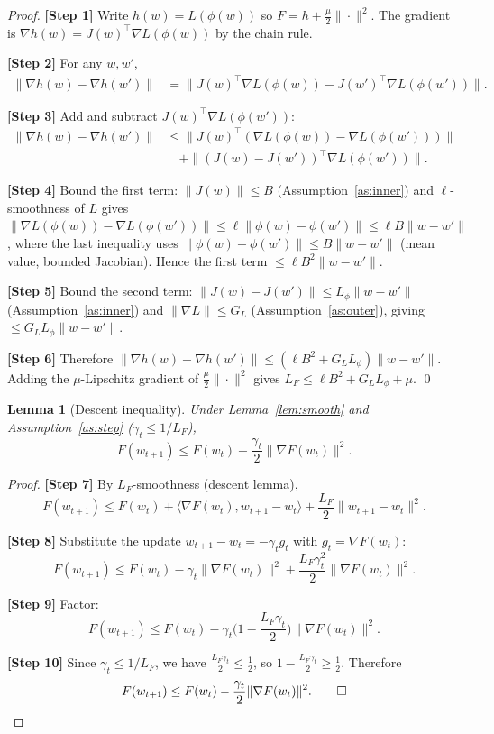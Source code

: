 \documentclass[11pt]{article}
\newtheorem{lemma}{Lemma}
\begin{document}
\begin{proof}
\textbf{[Step 1]} Write $h(w)=L(\phi(w))$ so $F = h + \tfrac{\mu}{2}\|\cdot\|^2$.
The gradient is $\nabla h(w) = J(w)^\top \nabla L(\phi(w))$ by the chain rule.

\textbf{[Step 2]} For any $w,w'$,
\begin{align*}
\|\nabla h(w) - \nabla h(w')\|
&= \big\| J(w)^\top \nabla L(\phi(w)) - J(w')^\top \nabla L(\phi(w')) \big\|.
\end{align*}

\textbf{[Step 3]} Add and subtract $J(w)^\top \nabla L(\phi(w'))$:
\begin{align*}
\|\nabla h(w) - \nabla h(w')\|
&\le \| J(w)^\top (\nabla L(\phi(w)) - \nabla L(\phi(w'))) \|\\
&\quad + \|(J(w)-J(w'))^\top \nabla L(\phi(w'))\|.
\end{align*}

\textbf{[Step 4]} Bound the first term: $\|J(w)\|\le B$ (Assumption~\ref{as:inner})
and $\ell$-smoothness of $L$ gives
$\|\nabla L(\phi(w))-\nabla L(\phi(w'))\| \le \ell\|\phi(w)-\phi(w')\|
\le \ell B\|w-w'\|$, where the last inequality uses
$\|\phi(w)-\phi(w')\|\le B\|w-w'\|$ (mean value, bounded Jacobian).
Hence the first term $\le \ell B^2 \|w-w'\|$.

\textbf{[Step 5]} Bound the second term: $\|J(w)-J(w')\|\le L_\phi\|w-w'\|$
(Assumption~\ref{as:inner}) and $\|\nabla L\|\le G_L$ (Assumption~\ref{as:outer}),
giving $\le G_L L_\phi \|w-w'\|$.

\textbf{[Step 6]} Therefore
$\|\nabla h(w)-\nabla h(w')\| \le (\ell B^2 + G_L L_\phi)\|w-w'\|$.
Adding the $\mu$-Lipschitz gradient of $\tfrac{\mu}{2}\|\cdot\|^2$ gives
$L_F \le \ell B^2 + G_L L_\phi + \mu$. \qed
\end{proof}

\begin{lemma}[Descent inequality]\label{lem:descent}
Under Lemma~\ref{lem:smooth} and Assumption~\ref{as:step}
($\gamma_t \le 1/L_F$),
\[
F(w_{t+1}) \le F(w_t) - \frac{\gamma_t}{2}\|\nabla F(w_t)\|^2 .
\]
\end{lemma}

\begin{proof}
\textbf{[Step 7]} By $L_F$-smoothness (descent lemma),
\[
F(w_{t+1}) \le F(w_t) + \langle \nabla F(w_t), w_{t+1}-w_t\rangle
+ \frac{L_F}{2}\|w_{t+1}-w_t\|^2 .
\]

\textbf{[Step 8]} Substitute the update $w_{t+1}-w_t = -\gamma_t g_t$ with
$g_t = \nabla F(w_t)$:
\[
F(w_{t+1}) \le F(w_t) - \gamma_t \|\nabla F(w_t)\|^2
+ \frac{L_F \gamma_t^2}{2}\|\nabla F(w_t)\|^2 .
\]

\textbf{[Step 9]} Factor:
\[
F(w_{t+1}) \le F(w_t) - \gamma_t\Big(1 - \frac{L_F \gamma_t}{2}\Big)
\|\nabla F(w_t)\|^2 .
\]

\textbf{[Step 10]} Since $\gamma_t \le 1/L_F$, we have
$\tfrac{L_F\gamma_t}{2}\le \tfrac12$, so
$1-\tfrac{L_F\gamma_t}{2}\ge \tfrac12$. Therefore
\[
F(w_{t+1}) \le F(w_t) - \frac{\gamma_t}{2}\|\nabla F(w_t)\|^2 . \qed
\]
\end{proof}
\end{document}
